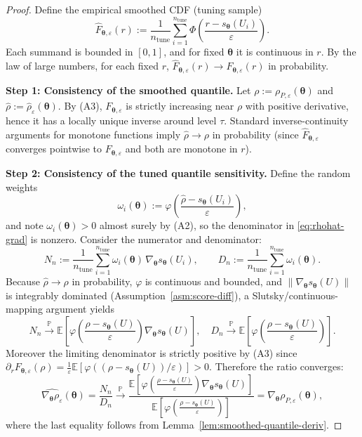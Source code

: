 \documentclass[lettersize,journal]{IEEEtran}
\newcommand{\E}{\mathbb{E}}
\newcommand{\Prob}{\mathbb{P}}
\newcommand{\btheta}{\bm{\theta}}
\theoremstyle{definition}
\begin{document}
\begin{proof}
Define the empirical smoothed CDF (tuning sample)
\[
\widehat F_{\btheta,\varepsilon}(r)
:=\frac{1}{n_{\mathrm{tune}}}\sum_{i=1}^{n_{\mathrm{tune}}}
\Phi\!\left(\frac{r-s_{\btheta}(U_i)}{\varepsilon}\right).
\]
Each summand is bounded in $[0,1]$, and for fixed $\btheta$ it is continuous in $r$.
By the law of large numbers, for each fixed $r$,
$\widehat F_{\btheta,\varepsilon}(r)\to F_{\btheta,\varepsilon}(r)$ in probability.

\textbf{Step 1: Consistency of the smoothed quantile.}
Let $\rho:=\rho_{P,\varepsilon}(\btheta)$ and $\hat\rho:=\hat\rho_\varepsilon(\btheta)$.
By (A3), $F_{\btheta,\varepsilon}$ is strictly increasing near $\rho$ with positive derivative, hence it has a locally unique inverse around level $\tau$.
Standard inverse-continuity arguments for monotone functions imply $\hat\rho\to\rho$ in probability
(since $\widehat F_{\btheta,\varepsilon}$ converges pointwise to $F_{\btheta,\varepsilon}$ and both are monotone in $r$).

\textbf{Step 2: Consistency of the tuned quantile sensitivity.}
Define the random weights
\[
\omega_i(\btheta):=\varphi\!\left(\frac{\hat\rho-s_{\btheta}(U_i)}{\varepsilon}\right),
\]
and note $\omega_i(\btheta)>0$ almost surely by (A2), so the denominator in \eqref{eq:rhohat-grad} is nonzero.
Consider the numerator and denominator:
\[
N_n:=\frac{1}{n_{\mathrm{tune}}}\sum_{i=1}^{n_{\mathrm{tune}}}\omega_i(\btheta)\,\nabla_{\btheta}s_{\btheta}(U_i),
\qquad
D_n:=\frac{1}{n_{\mathrm{tune}}}\sum_{i=1}^{n_{\mathrm{tune}}}\omega_i(\btheta).
\]
Because $\hat\rho\to\rho$ in probability, $\varphi$ is continuous and bounded, and $\|\nabla_{\btheta}s_{\btheta}(U)\|$ is integrably dominated (Assumption~\ref{asm:score-diff}),
a Slutsky/continuous-mapping argument yields
\[
N_n \xrightarrow{\Prob} \E\!\left[\varphi\!\left(\frac{\rho-s_{\btheta}(U)}{\varepsilon}\right)\nabla_{\btheta}s_{\btheta}(U)\right],
\quad
D_n \xrightarrow{\Prob} \E\!\left[\varphi\!\left(\frac{\rho-s_{\btheta}(U)}{\varepsilon}\right)\right].
\]
Moreover the limiting denominator is strictly positive by (A3) since
$\partial_rF_{\btheta,\varepsilon}(\rho)=\frac{1}{\varepsilon}\E[\varphi((\rho-s_{\btheta}(U))/\varepsilon)]>0$.
Therefore the ratio converges:
\[
\widehat{\nabla_{\btheta}\rho_\varepsilon}(\btheta)=\frac{N_n}{D_n}
\xrightarrow{\Prob}
\frac{\E\!\left[\varphi\!\left(\frac{\rho-s_{\btheta}(U)}{\varepsilon}\right)\nabla_{\btheta}s_{\btheta}(U)\right]}
{\E\!\left[\varphi\!\left(\frac{\rho-s_{\btheta}(U)}{\varepsilon}\right)\right]}
=\nabla_{\btheta}\rho_{P,\varepsilon}(\btheta),
\]
where the last equality follows from Lemma~\ref{lem:smoothed-quantile-deriv}.


\end{proof}
\end{document}
